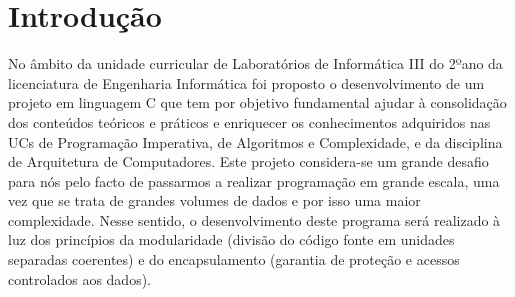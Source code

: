 \chapter{Introdução}

No âmbito da unidade curricular de Laboratórios de Informática III do 2ºano da licenciatura de Engenharia Informática foi proposto o desenvolvimento de um projeto em linguagem C que tem por objetivo fundamental ajudar à consolidação dos conteúdos teóricos e práticos e enriquecer os conhecimentos adquiridos nas UCs de Programação Imperativa, de Algoritmos e Complexidade, e da disciplina de Arquitetura de Computadores. Este projeto considera-se um grande desafio para nós pelo facto de passarmos a realizar programação em grande escala, uma vez que se trata de grandes volumes de dados e por isso uma maior complexidade. Nesse sentido, o desenvolvimento deste programa será realizado à luz dos princípios da modularidade (divisão do código fonte em unidades separadas coerentes) e do encapsulamento (garantia de proteção e acessos controlados aos dados). 
